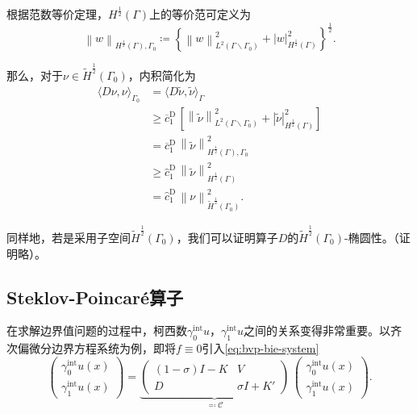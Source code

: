 根据范数等价定理，$H^{\frac{1}{2}}(\Gamma)$上的等价范可定义为
\begin{equation*}
  \left\| w \right\|_{H^{\frac{1}{2}}(\Gamma), \Gamma_{0}}
  \coloneqq
  \left\{
  \left\| w \right\|_{L^{2}(\Gamma \backslash \Gamma_{0})}^{2}
  + \left| w \right|_{H^{\frac{1}{2}}(\Gamma)}^{2}
  \right\}^{\frac{1}{2}}.
\end{equation*}

那么，对于$\nu \in \widetilde{H}^{\frac{1}{2}}(\Gamma_{0})$，内积简化为
\begin{equation*}
  \begin{split}
    \langle D \nu, \nu \rangle_{\Gamma_{0}}
    & = \langle D \widetilde{\nu}, \widetilde{\nu} \rangle_{\Gamma} \\
    & \ge \overline{c}_{1}^{\text{D}} \,
    \left[
    \left\| \widetilde{\nu} \right\|_{L^{2}(\Gamma \backslash \Gamma_{0})}^{2}
    + \left| \widetilde{\nu} \right|_{H^{\frac{1}{2}}(\Gamma)}^{2}
    \right] \\
    & = \overline{c}_{1}^{\text{D}} \,
    \left\| \widetilde{\nu} \right\|_{H^{\frac{1}{2}}(\Gamma), \Gamma_{0}}^{2} \\
    & \ge \widehat{c}_{1}^{\text{D}} \,
    \left\| \widetilde{\nu} \right\|_{H^{\frac{1}{2}}(\Gamma)}^{2} \\
    & = \widehat{c}_{1}^{\text{D}} \,
    \left\| \nu \right\|_{\widetilde{H}^{\frac{1}{2}}(\Gamma_{0})}^{2}.
  \end{split}
\end{equation*}

同样地，若是采用子空间$\widetilde{H}^{\frac{1}{2}}(\Gamma_{0})$，我们可以证明算子$D$的$\widetilde{H}^{\frac{1}{2}}(\Gamma_{0})$-椭圆性。（证明略）。

\subsection{Steklov-Poincaré算子}
\label{sec:steklov-poincare-operator}

在求解边界值问题的过程中，柯西数$\gamma_{0}^{\text{int}} u$，$\gamma_{1}^{\text{int}} u$之间的关系变得非常重要。以齐次偏微分边界方程系统为例，即将$f \equiv 0$引入\eqref{eq:bvp-bie-system}
\begin{equation}
\label{eq:bvp-bie-system-spoperator}
  \begin{pmatrix}
    \gamma_{0}^{\text{int}} u(x) \\
    \gamma_{1}^{\text{int}} u(x)
  \end{pmatrix}
  =
  \underbrace{
  \begin{pmatrix}
    \left( 1-\sigma \right) I - K & V \\
    D & \sigma I + K'
  \end{pmatrix}
  }_{\eqqcolon \mathcal{C}}
  \,
  \begin{pmatrix}
    \gamma_{0}^{\text{int}} u(x)\\
    \gamma_{1}^{\text{int}} u(x)
  \end{pmatrix}.
\end{equation}

